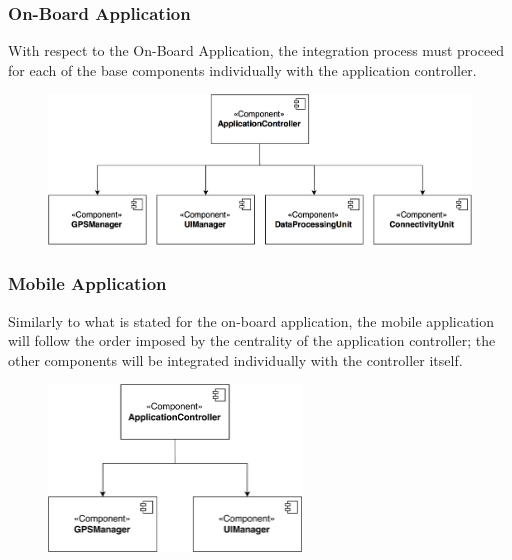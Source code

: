 \subsubsection{On-Board Application}
With respect to the On-Board Application, the integration process must proceed for each of the base components individually with the application controller.

\begin{figure}[H]
\begin{center}
		\includegraphics[width=\textwidth]{./integration_strategy/diagrams/on_board.png}
\end{center}
\end{figure}

\subsubsection{Mobile Application}
Similarly to what is stated for the on-board application, the mobile application will follow the order imposed by the centrality of the application controller; the other components will be integrated individually with the controller itself.

\begin{figure}[H]
\begin{center}
		\includegraphics[width=0.6\textwidth]{./integration_strategy/diagrams/mobile.png}
\end{center}
\end{figure}

